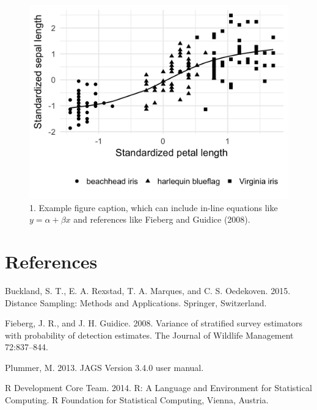 \documentclass[]{article}
\begin{document}
\begin{figure}[htbp]
\centering
\includegraphics{ms_figures/figure1.png}
\caption{1. Example figure caption, which can include in-line equations
like \(y = \alpha + \beta x\) and references like Fieberg and Guidice
(2008). \label{figure1}}
\end{figure}

\section*{References}\label{references}

\hypertarget{refs}{}
\hypertarget{ref-Buckland:2015}{}
Buckland, S. T., E. A. Rexstad, T. A. Marques, and C. S. Oedekoven.
2015. Distance Sampling: Methods and Applications. Springer,
Switzerland.

\hypertarget{ref-Fieberg:2008}{}
Fieberg, J. R., and J. H. Guidice. 2008. Variance of stratified survey
estimators with probability of detection estimates. The Journal of
Wildlife Management 72:837--844.

\hypertarget{ref-Plummer:2013}{}
Plummer, M. 2013. JAGS Version 3.4.0 user manual.

\hypertarget{ref-R:2014}{}
R Development Core Team. 2014. R: A Language and Environment for
Statistical Computing. R Foundation for Statistical Computing, Vienna,
Austria.
\end{document}
